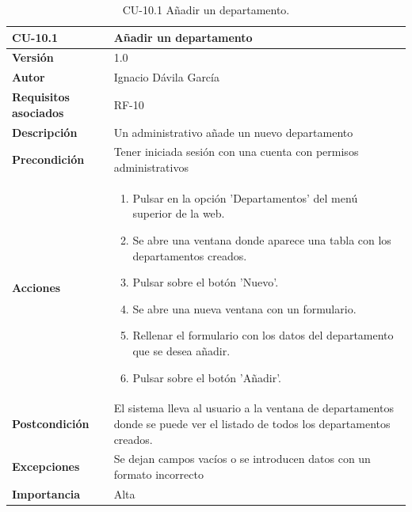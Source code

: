 \begin{table}[p]
	\centering
	\begin{tabularx}{\linewidth}{ p{} p{} }
		\toprule
		\textbf{CU-10.1}    & \textbf{Añadir un departamento}\\
		\toprule
		\textbf{Versión}              & 1.0    \\
		\textbf{Autor}                & Ignacio Dávila García \\
		\textbf{Requisitos asociados} & RF-10 \\
		\textbf{Descripción}          & Un administrativo añade un nuevo departamento \\
		\textbf{Precondición}         & Tener iniciada sesión con una cuenta con permisos administrativos \\
		\textbf{Acciones}             &
		\begin{enumerate}
			\def\labelenumi{\arabic{enumi}.}
			\tightlist
			\item Pulsar en la opción 'Departamentos' del menú superior de la web.
			\item Se abre una ventana donde aparece una tabla con los departamentos creados.
			\item Pulsar sobre el botón 'Nuevo'.
			\item Se abre una nueva ventana con un formulario.
			\item Rellenar el formulario con los datos del departamento que se desea añadir.
			\item Pulsar sobre el botón 'Añadir'.
		\end{enumerate}\\
		\textbf{Postcondición}        & El sistema lleva al usuario a la ventana de departamentos donde se puede ver el listado de todos los departamentos creados. \\
		\textbf{Excepciones}          & Se dejan campos vacíos o se introducen datos con un formato incorrecto \\
		\textbf{Importancia}          & Alta \\
		\bottomrule
	\end{tabularx}
	\caption{CU-10.1 Añadir un departamento.}
\end{table}

